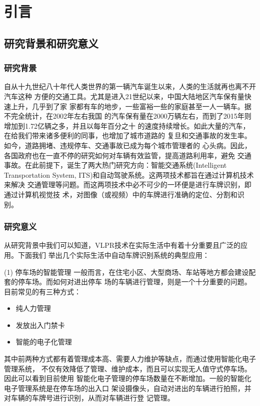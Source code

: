 \chapter{引言}
\section{研究背景和研究意义}
\subsection{研究背景}
自从十九世纪八十年代人类世界的第一辆汽车诞生以来，人类的生活就再也离不开汽车这种
方便的交通工具。尤其是进入21世纪以来，中国大陆地区汽车保有量快速上升，几乎到了家
家都有车的地步，一些富裕一些的家庭甚至一人一辆车。据不完全统计，在2002年左右我国
的汽车保有量在2000万辆左右，而到了2015年则增加到1.72亿辆之多，并且以每年百分之十
的速度持续增长。如此大量的汽车，在给我们带来诸多便利的同事，也增加了城市道路的
复旦和交通事故的发生率。如今，道路拥堵、违规停车、交通事故已成为每个城市管理者的
心头病。因此，各国政府也在一直不停的研究如何对车辆有效监管，提高道路利用率，避免
交通事故。在此前提下，诞生了两大热门研究方向：智能交通系统(Intelligent
Transportation System, ITS)和自动驾驶系统。这两项技术都旨在通过计算机技术来解决
交通管理等问题。而这两项技术中必不可少的一环便是进行车牌识别，即通过计算机视觉技
术，对图像（或视频）中的车牌进行准确的定位、分割和识别。

\subsection{研究意义}
从研究背景中我们可以知道，VLPR技术在实际生活中有着十分重要且广泛的应用。下面我们
举出几个实际生活中自动车牌识别系统的典型应用：

(1) 停车场的智能管理
一般而言，在住宅小区、大型商场、车站等地方都会建设配套的停车场。而如何对进出停车
场的车辆进行管理，则是一个十分重要的问题。目前常见的有三种方式：
\begin{itemize}
\item 纯人力管理
\item 发放出入门禁卡
\item 智能的电子化管理
\end{itemize}
其中前两种方式都有着管理成本高、需要人力维护等缺点，而通过使用智能化电子管理系统，
不仅有效降低了管理、维护成本，而且可以实现无人值守式停车场。因此可以看到目前使用
智能化电子管理的停车场数量在不断增加。一般的智能化电子管理系统是在停车场的出入口
架设摄像头，自动对进出的车辆进行拍照，并对车辆的车牌号进行识别，从而对车辆进行登
记管理。

